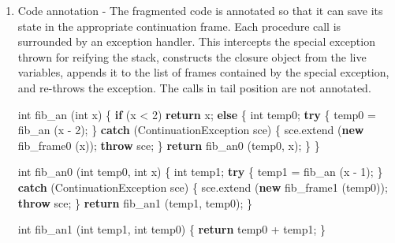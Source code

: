 \documentclass[12pt,a4paper,oneside,openright]{book}
\newenvironment{Shaded}{\begin{snugshade}}{\end{snugshade}}
\newcommand{\KeywordTok}[1]{\textcolor[rgb]{0.13,0.29,0.53}{\textbf{{#1}}}}
\newcommand{\DataTypeTok}[1]{\textcolor[rgb]{0.13,0.29,0.53}{{#1}}}
\newcommand{\DecValTok}[1]{\textcolor[rgb]{0.00,0.00,0.81}{{#1}}}
\newcommand{\FunctionTok}[1]{\textcolor[rgb]{0.00,0.00,0.00}{{#1}}}
\newcommand{\NormalTok}[1]{{#1}}
\begin{document}
\begin{enumerate}
\begin{Shaded}
\begin{Highlighting}[]
\NormalTok{\}}
\end{Highlighting}
\end{Shaded}
\item
  Code annotation - The fragmented code is annotated so that it can save
  its state in the appropriate continuation frame. Each procedure call
  is surrounded by an exception handler. This intercepts the special
  exception thrown for reifying the stack, constructs the closure object
  from the live variables, appends it to the list of frames contained by
  the special exception, and re-throws the exception. The calls in tail
  position are not annotated.

\begin{Shaded}
\begin{Highlighting}[]
\DataTypeTok{int} \FunctionTok{fib_an} \NormalTok{(}\DataTypeTok{int} \NormalTok{x) \{}
    \KeywordTok{if} \NormalTok{(x < }\DecValTok{2}\NormalTok{)}
        \KeywordTok{return} \NormalTok{x;}
    \KeywordTok{else} \NormalTok{\{}
        \DataTypeTok{int} \NormalTok{temp0;}
        \KeywordTok{try} \NormalTok{\{}
            \NormalTok{temp0 = }\FunctionTok{fib_an} \NormalTok{(x - }\DecValTok{2}\NormalTok{);}
        \NormalTok{\} }\KeywordTok{catch} \NormalTok{(ContinuationException sce) \{}
            \NormalTok{sce.}\FunctionTok{extend} \NormalTok{(}\KeywordTok{new} \FunctionTok{fib_frame0} \NormalTok{(x));}
            \KeywordTok{throw} \NormalTok{sce;}
        \NormalTok{\}}
        \KeywordTok{return} \FunctionTok{fib_an0} \NormalTok{(temp0, x);}
    \NormalTok{\}}
\NormalTok{\}}

\DataTypeTok{int} \FunctionTok{fib_an0} \NormalTok{(}\DataTypeTok{int} \NormalTok{temp0, }\DataTypeTok{int} \NormalTok{x) \{}
    \DataTypeTok{int} \NormalTok{temp1;}
    \KeywordTok{try} \NormalTok{\{}
        \NormalTok{temp1 = }\FunctionTok{fib_an} \NormalTok{(x - }\DecValTok{1}\NormalTok{);}
    \NormalTok{\} }\KeywordTok{catch} \NormalTok{(ContinuationException sce) \{}
        \NormalTok{sce.}\FunctionTok{extend} \NormalTok{(}\KeywordTok{new} \FunctionTok{fib_frame1} \NormalTok{(temp0));}
        \KeywordTok{throw} \NormalTok{sce;}
    \NormalTok{\}}
    \KeywordTok{return} \FunctionTok{fib_an1} \NormalTok{(temp1, temp0);}
\NormalTok{\}}

\DataTypeTok{int} \FunctionTok{fib_an1} \NormalTok{(}\DataTypeTok{int} \NormalTok{temp1, }\DataTypeTok{int} \NormalTok{temp0) \{}
    \KeywordTok{return} \NormalTok{temp0 + temp1;}
\NormalTok{\}}
\end{Highlighting}
\end{Shaded}
\end{enumerate}
\end{document}
